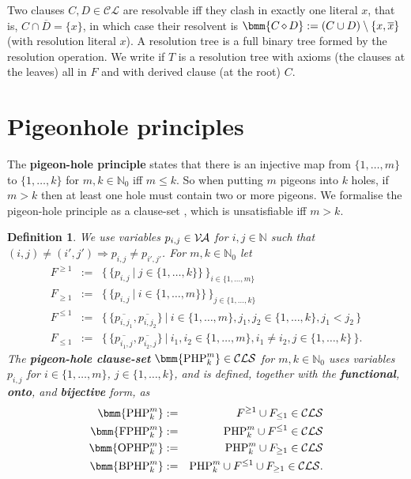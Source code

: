 \documentclass{report}
\newtheorem{defi}{Definition}[section]
\newcommand{\mb}{{\:|\:}} %
\newcommand{\set}[1]{\{ #1 \}}
\newcommand{\setb}[1]{\big \{ \, #1 \, \big \}}
\newcommand{\tb}[2]{\set{#1, \dots, #2}} %
\newcommand{\ol}{\overline}
\newcommand{\sm}{\setminus}
\newcommand{\Ra}{\Rightarrow}
\newcommand{\mc}{\mathcal}
\newcommand{\NN}{\mathbb{N}}
\newcommand{\NNZ}{\NN_0}
\newcommand{\Va}{\mc{V\hspace{-0.1em}A}}
\newcommand{\Cl}{\mc{CL}}
\newcommand{\Cls}{\mc{CLS}}
\DeclareMathOperator{\res}{\diamond} %
\newcommand{\php}{\mathrm{PHP}}
\newcommand{\fphp}{\mathrm{FPHP}} %
\newcommand{\ophp}{\mathrm{OPHP}} %
\newcommand{\ofphp}{\mathrm{BPHP}} %
\begin{document}
Two clauses $C, D \in \Cl$ are resolvable iff they clash in exactly one literal $x$, that is, $C \cap \ol{D} = \set{x}$, in which case their resolvent is $\bmm{C \res D} := (C \cup D) \sm \set{x,\ol{x}}$ (with resolution literal $x$). A resolution tree is a full binary tree formed by the resolution operation. We write  if $T$ is a resolution tree with axioms (the clauses at the leaves) all in $F$ and with derived clause (at the root) $C$.


\section{Pigeonhole principles}
\label{sec:php}

The \textbf{pigeon-hole principle} states that there is an injective map from $\tb1m$ to $\tb1k$ for $m,k \in \NNZ$ iff $m \le k$. So when putting $m$ pigeons into $k$ holes, if $m > k$ then at least one hole must contain two or more pigeons. We formalise the pigeon-hole principle as a clause-set \bmm{\php^m_k}, which is unsatisfiable iff $m > k$.
\begin{defi}\label{def:php}
  We use variables $p_{i,j} \in \Va$ for $i, j \in \NN$ such that $(i,j) \not= (i',j') \Ra p_{i,j} \not= p_{i',j'}$. For $m, k \in \NNZ$ let
  \begin{eqnarray*}
    F^{\ge 1} & := & \setb{\set{p_{i,j} \mb j \in \tb1k}}_{i \in \tb1m }\\
     F_{\ge 1} & := & \setb{\set{p_{i,j} \mb i \in \tb 1m}}_{j \in \tb 1k }\\
    F^{\le 1} & := & \setb{\set{\ol{p_{i,j_1}},\ol{p_{i,j_2}}} \mb i \in \tb 1m, j_1, j_2 \in \tb 1k, j_1 < j_2}\\
    F_{\le 1} & := & \setb{ \set{\ol{p_{i_1,j}},\ol{p_{i_2,j}}} \mb i_1,i_2 \in \tb1m, i_1 \not= i_2, j \in \tb1k }.
  \end{eqnarray*}
  The \textbf{pigeon-hole clause-set} $\bmm{\php^m_k} \in \Cls$ for $m,k \in \NNZ$ uses variables $p_{i,j}$ for $i \in \tb 1m$, $j \in \tb 1k$, and is defined, together with the \textbf{functional}, \textbf{onto}, and \textbf{bijective} form, as
  \begin{eqnarray*}
    \bmm{\php^m_k} & := & F^{\ge 1} \cup F_{\le 1} \in \Cls\\
    \bmm{\fphp^m_k} & := & \php^m_k \cup F^{\le 1} \in \Cls\\
    \bmm{\ophp^m_k} & := & \php^m_k \cup F_{\ge 1} \in \Cls\\
    \bmm{\ofphp^m_k} & := & \php^m_k \cup F^{\le 1} \cup F_{\ge 1} \in \Cls.
  \end{eqnarray*}
\end{defi}
\end{document}
